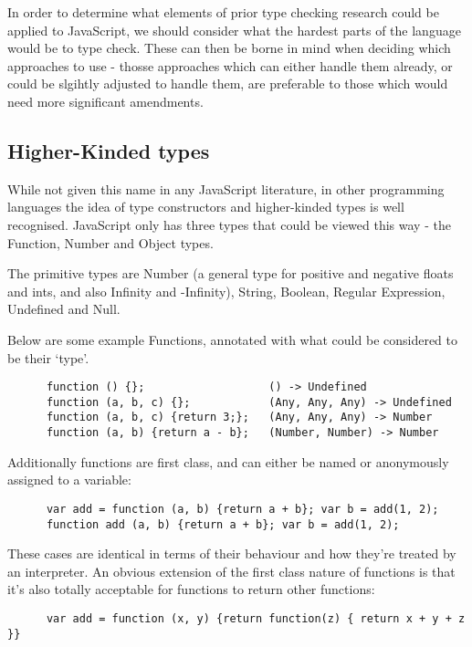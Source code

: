 \documentclass[british, twoside]{bhamthesis}
\theoremstyle{definition}
\begin{document}
    In order to determine what elements of prior type checking research could be applied to JavaScript, we should consider what the hardest parts of the language would be to type check. These can then be borne in mind when deciding which approaches to use - thosse approaches which can either handle them already, or could be slgihtly adjusted to handle them, are preferable to those which would need more significant amendments.

  \subsection{Higher-Kinded types}
    While not given this name in any JavaScript literature, in other programming languages the idea of type constructors and higher-kinded types is well recognised. JavaScript only has three types that could be viewed this way - the Function, Number and Object types.

    The primitive types are Number (a general type for positive and negative floats and ints, and also Infinity and -Infinity), String, Boolean, Regular Expression, Undefined and Null.

    Below are some example Functions, annotated with what could be considered to be their `type'.

    \begin{lstlisting}
      function () {};                   () -> Undefined
      function (a, b, c) {};            (Any, Any, Any) -> Undefined
      function (a, b, c) {return 3;};   (Any, Any, Any) -> Number
      function (a, b) {return a - b};   (Number, Number) -> Number
    \end{lstlisting}

    Additionally functions are first class, and can either be named or anonymously assigned to a variable:

    \begin{lstlisting}
      var add = function (a, b) {return a + b}; var b = add(1, 2);
      function add (a, b) {return a + b}; var b = add(1, 2);
    \end{lstlisting}

    These cases are identical in terms of their behaviour and how they're treated by an interpreter. An obvious extension of the first class nature of functions is that it's also totally acceptable for functions to return other functions:

    \begin{lstlisting}
      var add = function (x, y) {return function(z) { return x + y + z }}
    \end{lstlisting}
\end{document}
